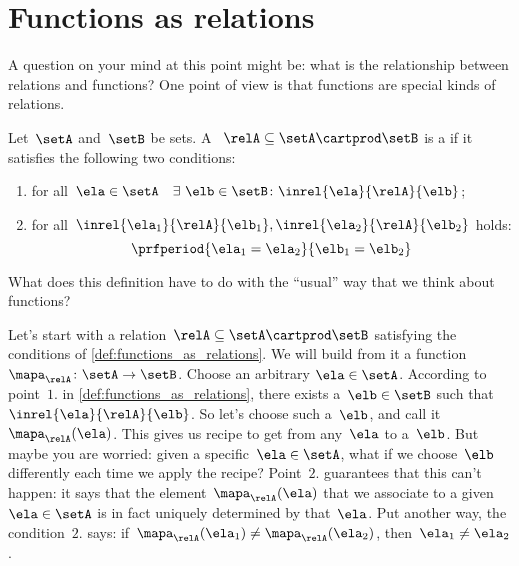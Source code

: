 
\section{Functions as relations}

A question on your mind at this point might be: what is the relationship between relations and functions?
One point of view is that functions are special kinds of relations.

\begin{definition}
    \label{def:functions_as_relations}
    Let~$\setA$ and~$\setB$ be sets.
    A ~$\relA \subseteq \setA \cartprod \setB$ is a \emph{} if it satisfies the following two conditions:
    \begin{enumerate}
        \item for all~$\ela \in \setA \quad \exists \ \elb \in \setB\colon  \inrel{\ela}{\relA}{\elb}$;
        \item for all~$\inrel{\ela_1}{\relA}{\elb_1}, \inrel{\ela_2}{\relA}{\elb_2}$ holds:
              \begin{equation*}
                  \prfperiod{\ela_1 = \ela_2}{\elb_1 = \elb_2}
              \end{equation*}
    \end{enumerate}
\end{definition}

What does this definition have to do with the ``usual'' way that we think about functions?

Let's start with a relation~$\relA \subseteq \setA \cartprod \setB$ satisfying the conditions of \cref{def:functions_as_relations}.
We will build from it a function~$\mapa_\relA \colon \setA \to \setB$.
Choose an arbitrary $\ela \in \setA$.
According to point~$1.$ in \cref{def:functions_as_relations}, there exists a~$\elb \in \setB$ such that~$\inrel{\ela}{\relA}{\elb}$.
So let's choose such a~$\elb$, and call it~$\mapa_\relA(\ela)$.
This gives us recipe to get from any~$\ela$ to a~$\elb$.
But maybe you are worried: given a specific~$\ela \in \setA$, what if we choose~$\elb$ differently each time we apply the recipe?
Point~$2.$ guarantees that this can't happen: it says that the element~$\mapa_\relA(\ela)$ that we associate to a given~$\ela \in \setA$ is in fact uniquely determined by that~$\ela$.
Put another way, the condition~$2.$ says: if~$\mapa_\relA(\ela_1) \neq \mapa_\relA(\ela_2)$, then~$\ela_1 \neq\ela_2$.


